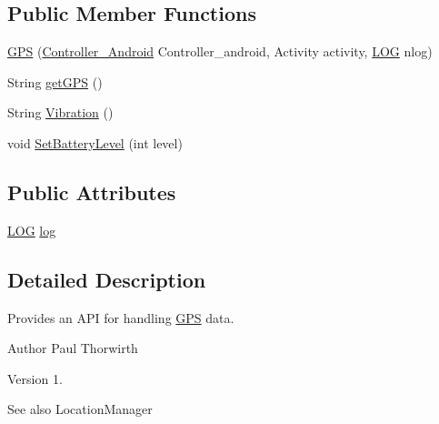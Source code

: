 \subsection*{Public Member Functions}
\begin{DoxyCompactItemize}
\item 
\hyperlink{classswp_1_1tuilmenau_1_1carduinodroid_1_1controller_1_1_g_p_s_acb77cfc88d86505b4442741310c179e8}{G\+P\+S} (\hyperlink{classswp_1_1tuilmenau_1_1carduinodroid_1_1controller_1_1_controller___android}{Controller\+\_\+\+Android} Controller\+\_\+android, Activity activity, \hyperlink{classswp_1_1tuilmenau_1_1carduinodroid_1_1model_1_1_l_o_g}{L\+O\+G} nlog)
\item 
String \hyperlink{classswp_1_1tuilmenau_1_1carduinodroid_1_1controller_1_1_g_p_s_aba91a5991ec2a3b6d0c33da46e9b5121}{get\+G\+P\+S} ()
\item 
String \hyperlink{classswp_1_1tuilmenau_1_1carduinodroid_1_1controller_1_1_g_p_s_afda4a9143b1495da7da755c6d07a42d9}{Vibration} ()
\item 
void \hyperlink{classswp_1_1tuilmenau_1_1carduinodroid_1_1controller_1_1_g_p_s_a61b2fb547dafc37ccfa1bf4c9137ae59}{Set\+Battery\+Level} (int level)
\end{DoxyCompactItemize}
\subsection*{Public Attributes}
\begin{DoxyCompactItemize}
\item 
\hyperlink{classswp_1_1tuilmenau_1_1carduinodroid_1_1model_1_1_l_o_g}{L\+O\+G} \hyperlink{classswp_1_1tuilmenau_1_1carduinodroid_1_1controller_1_1_g_p_s_aa7191fb0e296301362a1ad86f15fa5be}{log}
\end{DoxyCompactItemize}


\subsection{Detailed Description}
Provides an A\+P\+I for handling \hyperlink{classswp_1_1tuilmenau_1_1carduinodroid_1_1controller_1_1_g_p_s}{G\+P\+S} data.

\begin{DoxyAuthor}{Author}
Paul Thorwirth 
\end{DoxyAuthor}
\begin{DoxyVersion}{Version}
1. 
\end{DoxyVersion}
\begin{DoxySeeAlso}{See also}
Location\+Manager 
\end{DoxySeeAlso}


